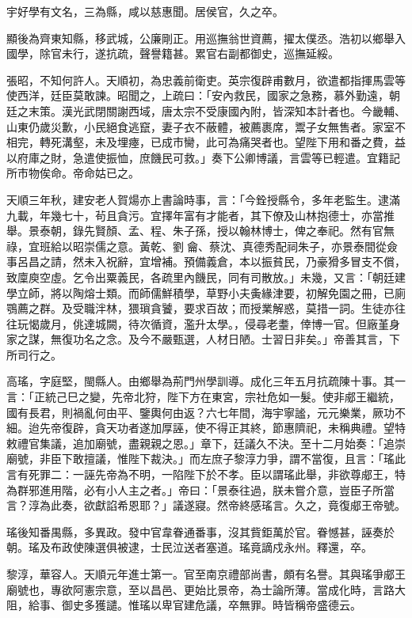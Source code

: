 \begin{pinyinscope}
宇好學有文名，三為縣，咸以慈惠聞。居侯官，久之卒。

顯後為齊東知縣，移武城，公廉剛正。用巡撫翁世資薦，擢太僕丞。浩初以鄉舉入國學，除官未行，遂抗疏，聲譽籍甚。累官右副都御史，巡撫延綏。

張昭，不知何許人。天順初，為忠義前衛吏。英宗復辟甫數月，欲遣都指揮馬雲等使西洋，廷臣莫敢諫。昭聞之，上疏曰：「安內救民，國家之急務，慕外勤遠，朝廷之末策。漢光武閉關謝西域，唐太宗不受康國內附，皆深知本計者也。今畿輔、山東仍歲災歉，小民絕食逃竄，妻子衣不蔽體，被薦裹席，鬻子女無售者。家室不相完，轉死溝壑，未及埋瘞，已成市臠，此可為痛哭者也。望陛下用和番之費，益以府庫之財，急遣使振恤，庶饑民可救。」奏下公卿博議，言雲等已輕遣。宜籍記所市物俟命。帝命姑已之。

天順三年秋，建安老人賀煬亦上書論時事，言：「今銓授縣令，多年老監生。逮滿九載，年幾七十，茍且貪污。宜擇年富有才能者，其下僚及山林抱德士，亦當推舉。景泰朝，錄先賢顏、孟、程、朱子孫，授以翰林博士，俾之奉祀。然有官無祿，宜班給以昭崇儒之意。黃乾、劉龠、蔡沈、真德秀配祠朱子，亦景泰間從僉事呂昌之請，然未入祝辭，宜增補。預備義倉，本以振貧民，乃豪猾多冒支不償，致廩庾空虛。乞令出粟義民，各疏里內饑民，同有司散放。」未幾，又言：「朝廷建學立師，將以陶熔士類。而師儒鮮積學，草野小夫夤緣津要，初解免園之冊，已廁鶚薦之群。及受職泮林，猥瑣貪饕，要求百故；而授業解惑，莫措一詞。生徒亦往往玩愒歲月，佻達城闕，待次循資，濫升太學。，侵尋老耋，倖博一官。但廠堇身家之謀，無復功名之念。及今不嚴甄選，人材日陋。士習日非矣。」帝善其言，下所司行之。

高瑤，字庭堅，閩縣人。由鄉舉為荊門州學訓導。成化三年五月抗疏陳十事。其一言：「正統己巳之變，先帝北狩，陛下方在東宮，宗社危如一髮。使非郕王繼統，國有長君，則禍亂何由平、鑒輿何由返？六七年間，海宇寧謐，元元樂業，厥功不細。迨先帝復辟，貪天功者遂加厚誣，使不得正其終，節惠隮祀，未稱典禮。望特敕禮官集議，追加廟號，盡親親之恩。」章下，廷議久不決。至十二月始奏：「追崇廟號，非臣下敢擅議，惟陛下裁決。」而左庶子黎淳力爭，謂不當復，且言：「瑤此言有死罪二：一誣先帝為不明，一陷陛下於不孝。臣以謂瑤此舉，非欲尊郕王，特為群邪進用階，必有小人主之者。」帝曰：「景泰往過，朕未嘗介意，豈臣子所當言？淳為此奏，欲獻諂希恩耶？」議遂寢。然帝終感瑤言。久之，竟復郕王帝號。

瑤後知番禺縣，多異政。發中官韋眷通番事，沒其貲鉅萬於官。眷憾甚，誣奏於朝。瑤及布政使陳選俱被逮，士民泣送者塞道。瑤竟謫戍永州。釋還，卒。

黎淳，華容人。天順元年進士第一。官至南京禮部尚書，頗有名譽。其與瑤爭郕王廟號也，專欲阿憲宗意，至以昌邑、更始比景帝，為士論所薄。當成化時，言路大阻，給事、御史多獲譴。惟瑤以卑官建危議，卒無罪。時皆稱帝盛德云。


\end{pinyinscope}
